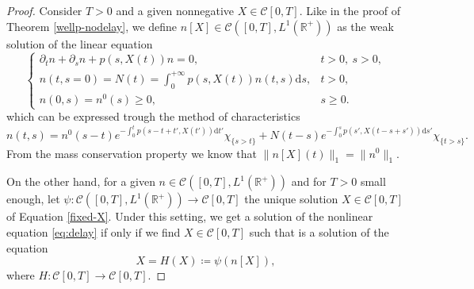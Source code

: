 \documentclass[11pt,a4paper]{article}
\newcommand{\R}{\mathbb{R}}
\newcommand{\dd}{\mathrm{d}}
\begin{document}
\begin{proof}
    Consider $T>0$ and a given nonnegative $X\in\mathcal{C}[0,T]$. Like in the proof of Theorem \ref{wellp-nodelay}, we define $n[X]\in\mathcal{C}([0,T],L^1(\R^+))$ as the weak solution of the linear equation
\begin{equation*}
    \begin{cases}
    \partial_tn+\partial_s n+p(s,X(t))n = 0,  & t>0,\: s>0, \\
    n(t,s=0)=N(t)=\int_0^{+\infty}p(s,X(t))n(t,s) \dd s,& t>0,\\
    n(0,s)=n^0(s)\geq0,& s\geq 0.
    \end{cases}
\end{equation*}
    which can be expressed trough the method of characteristics
 \begin{equation*}
    n(t,s)=n^0(s-t)e^{-\int_0^t p(s-t+t',X(t'))\dd t'}\chi_{\{s>t\}}+N(t-s)e^{-\int_0^s p(s',X(t-s+s'))\dd s'}\chi_{\{t>s\}}.
 \end{equation*}
    From the mass conservation property we know that $\|n[X](t)\|_1=\|n^0\|_1$.
    
    On the other hand, for a given $n\in\mathcal{C}([0,T],L^1(\R^+))$ and for $T>0$ small enough, let $\psi\colon \mathcal{C}\left([0,T],L^1(\R^+)\right)\to\mathcal{C}[0,T]$ the unique solution $X\in\mathcal{C}[0,T]$ of Equation \eqref{fixed-X}. Under this setting, we get a solution of the nonlinear equation \eqref{eq:delay} if only if we find $X\in\mathcal{C}[0,T]$ such that is a solution of the equation
\begin{equation*}
X=H(X)\coloneqq\psi\left(n[X]\right),
\end{equation*}
    where $H\colon\mathcal{C}[0,T]\to\mathcal{C}[0,T]$.
    

\end{proof}
\end{document}
